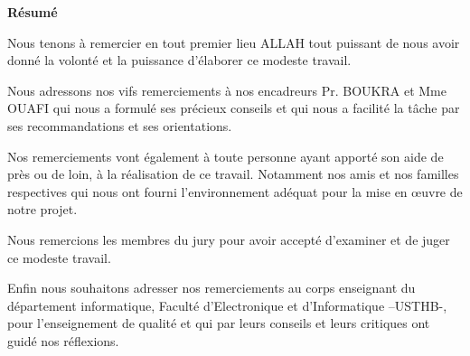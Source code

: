 
\thispagestyle{empty}

\LARGE\textbf{Résumé}

\Large{Nous tenons à remercier en tout premier lieu ALLAH tout  puissant de nous avoir donné la volonté et la puissance d’élaborer ce modeste travail.

Nous adressons nos vifs remerciements à nos encadreurs Pr. BOUKRA et Mme OUAFI qui nous a formulé ses précieux conseils et qui nous a  facilité la tâche par ses recommandations et ses  orientations.

Nos remerciements vont également à toute personne ayant apporté son aide de près ou de loin, à la réalisation de ce travail. Notamment nos amis et nos familles respectives qui nous ont fourni l'environnement adéquat pour la mise en œuvre de notre projet.

Nous remercions les membres du jury pour avoir accepté d’examiner et de juger ce modeste travail.

Enfin nous souhaitons adresser nos remerciements au corps enseignant du département informatique, Faculté d'Electronique et d'Informatique –USTHB-, pour l'enseignement de qualité et qui par leurs conseils et leurs critiques ont guidé nos réflexions.}